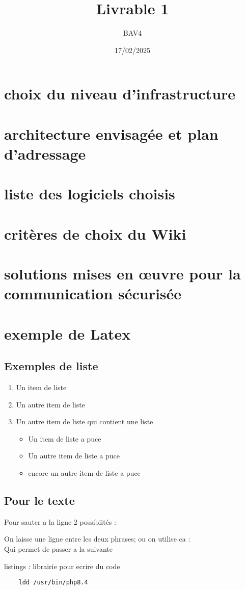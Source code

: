 \documentclass{article}
\title{Livrable 1}
\author{BAV4}
\date{17/02/2025}
\begin{document}
\section{choix du niveau d’infrastructure}

\section{architecture envisagée et plan d’adressage}

\section{liste des logiciels choisis}

\section{critères de choix du Wiki}

\section{solutions mises en œuvre pour la communication sécurisée}

\section{exemple de Latex}

\subsection{Exemples de liste}
\begin{enumerate}
    \item Un item de liste
    \item Un autre item de liste
    \item Un autre item de liste qui contient une liste 
        \begin{itemize}
        \item  Un item de liste a puce
        \item  Un autre item de liste a puce
        \item  encore un autre item de liste a puce
        \end{itemize}
\end{enumerate}

\subsection{Pour le texte}
Pour sauter a la ligne 2 possibiités : 

On laisse une ligne entre les deux phrases; ou on utilise ca : \\
Qui permet de passer a la suivante

listings : librairie pour ecrire du code
\begin{lstlisting}
    ldd /usr/bin/php8.4
\end{lstlisting} 
\end{document}
